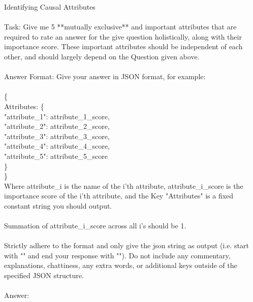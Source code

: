 \begin{promptbox}{Identifying Causal Attributes\\\\}
Task: Give me 5 **mutually exclusive** and important attributes that are required to rate an answer for the give question holistically, along with their importance score. These important attributes should be independent of each other, and should largely depend on the Question given above.\\
\\
Answer Format: Give your answer in JSON format, for example:\\
\\
\{\\
 Attributes: \{\\
 "attribute\_1": attribute\_1\_score,\\
 "attribute\_2": attribute\_2\_score,\\
 "attribute\_3": attribute\_3\_score,\\
 "attribute\_4": attribute\_4\_score,\\
 "attribute\_5": attribute\_5\_score\\
 \}\\
\}
\\
Where attribute\_i is the name of the i'th attribute, attribute\_i\_score is the importance score of the i'th attribute, and the Key "Attributes" is a fixed constant string you should output.\\
\\
Summation of attribute\_i\_score across all i's should be 1.\\
\\
Strictly adhere to the format and only give the json string as output (i.e. start with "{" and end your response with "}"). Do not include any commentary, explanations, chattiness, any extra words, or additional keys outside of the specified JSON structure.\\
\\
Answer:
\end{promptbox}



\clearpage
